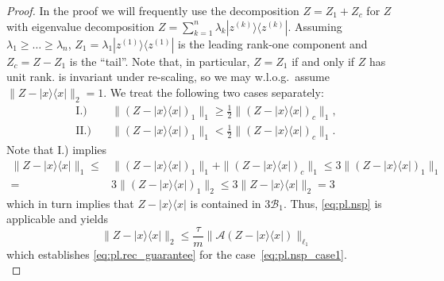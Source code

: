 \begin{proof}
In the proof we will frequently use the decomposition $ Z =  Z_1+ Z_c$ for $ Z$ with eigenvalue decomposition $ Z = \sum_{k=1}^n \lambda_k | z^{(k)} \rangle \! \langle  z^{(k)}|$.
Assuming $\lambda_1 \ge \ldots \ge \lambda_n$, $Z_1 = \lambda_1 | z^{(1)} \rangle \! \langle  z^{(1)}|$ is the leading rank-one component and $ Z_c =  Z- Z_1$ is the ``tail''.
Note that, in particular, $ Z =  Z_1$ if and only if $ Z$ has unit rank.
 is invariant under re-scaling, so we may w.l.o.g.\ assume $\|  Z-|{x} \rangle \! \langle {x}|\|_2=1$.
We treat the following two cases separately:
\begin{align}
  \mathrm{I.)} \quad& \| ( Z-|{x} \rangle \! \langle {x}|)_1 \|_1 \geq \frac{1}{2} \| ( Z-|{x} \rangle \! \langle {x}|)_c \|_1, \label{eq:pl.nsp_case1} \\
  \mathrm{II.)} \quad & \| ( Z-|{x} \rangle \! \langle {x}|)_1 \|_1 < \frac{1}{2} \| ( Z-|{x} \rangle \! \langle {x}|)_c \|_1. \label{eq:pl.nsp_case2}
\end{align}
Note that I.) implies
\begin{align}
  \|  Z-|{x} \rangle \! \langle {x}| \|_1 \leq &\| ( Z-|{x} \rangle \! \langle {x}|)_1 \|_1 + \| ( Z-|{x} \rangle \! \langle {x}|)_c \|_1 \leq 3 \| ( Z-|{x} \rangle \! \langle {x}|)_1 \|_1 \\
  = & 3 \| ( Z-|{x} \rangle \! \langle {x}|)_1 \|_2 \leq 3 \|  Z- |{x} \rangle \! \langle {x}| \|_2 = 3
\end{align}
which in turn implies that $ Z-| {x} \rangle \! \langle {x}|$ is contained in $3 \mathcal{B}_1$.
Thus, \eqref{eq:pl.nsp} is applicable and yields
\[
\|  Z - |{x} \rangle \! \langle {x}| \|_2 \leq  \frac{\tau}{m} \| \mathcal{A}( Z-|{x} \rangle \! \langle {x}|) \|_{\ell_1}
\]
which establishes \cref{eq:pl.rec_guarantee} for the case~\eqref{eq:pl.nsp_case1}.\\




\end{proof}
